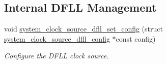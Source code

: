 \subsection*{Internal D\+F\+LL Management}
\begin{DoxyCompactItemize}
\item 
void \mbox{\hyperlink{group__asfdoc__sam0__system__clock__group_gaa15073d0d4bd347bf8855ac20fd1b93c}{system\+\_\+clock\+\_\+source\+\_\+dfll\+\_\+set\+\_\+config}} (struct \mbox{\hyperlink{structsystem__clock__source__dfll__config}{system\+\_\+clock\+\_\+source\+\_\+dfll\+\_\+config}} $\ast$const config)
\begin{DoxyCompactList}\small\item\em Configure the D\+F\+LL clock source. \end{DoxyCompactList}\end{DoxyCompactItemize}
